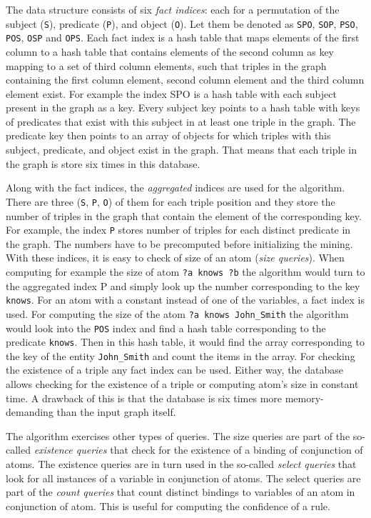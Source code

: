 The data structure consists of six \textit{fact indices}: each for a permutation of the subject (\verb|S|), predicate (\verb|P|), and object (\verb|O|). Let them be denoted as \verb|SPO|, \verb|SOP|, \verb|PSO|, \verb|POS|, \verb|OSP| and \verb|OPS|. Each fact index is a hash table that maps elements of the first column to a hash table that contains elements of the second column as key mapping to a set of third column elements, such that triples in the graph containing the first column element, second column element and the third column element exist. For example the index SPO is a hash table with each subject present in the graph as a key. Every subject key points to a hash table with keys of predicates that exist with this subject in at least one triple in the graph. The predicate key then points to an array of objects for which triples with this subject, predicate, and object exist in the graph. That means that each triple in the graph is store six times in this database.

Along with the fact indices, the \textit{aggregated} indices are used for the algorithm. There are three (\verb|S|, \verb|P|, \verb|O|) of them for each triple position and they store the number of triples in the graph that contain the element of the corresponding key. For example, the index \verb|P| stores number of triples for each distinct predicate in the graph. The numbers have to be precomputed before initializing the mining. With these indices, it is easy to check of size of an atom (\textit{size queries}). When computing for example the size of atom \verb|?a knows ?b| the algorithm would turn to the aggregated index P and simply look up the number corresponding to the key \verb|knows|. For an atom with a constant instead of one of the variables, a fact index is used. For computing the size of the atom \verb|?a knows John_Smith| the algorithm would look into the \verb|POS| index and find a hash table corresponding to the predicate \verb|knows|. Then in this hash table, it would find the array corresponding to the key of the entity \verb|John_Smith| and count the items in the array. For checking the existence of a triple any fact index can be used. Either way, the database allows checking for the existence of a triple or computing atom's size in constant time. A drawback of this is that the database is six times more memory-demanding than the input graph itself.

The algorithm exercises other types of queries. The size queries are part of the so-called \textit{existence queries} that check for the existence of a binding of conjunction of atoms. The existence queries are in turn used in the so-called \textit{select queries} that look for all instances of a variable in conjunction of atoms. The select queries are part of the \textit{count queries} that count distinct bindings to variables of an atom in conjunction of atom. This is useful for computing the confidence of a rule. 

